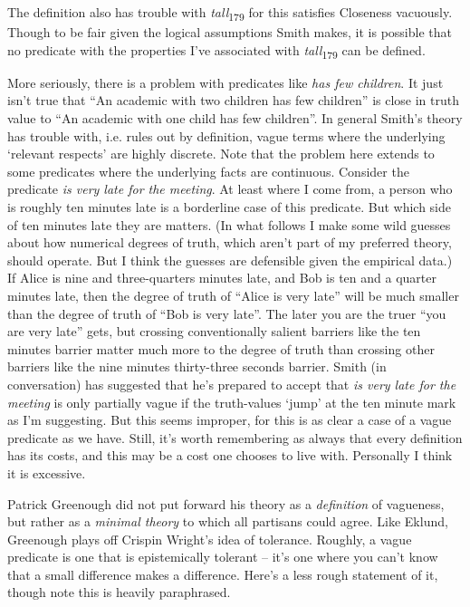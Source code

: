 The definition also has trouble with \textit{tall}\textsubscript{179} for this satisfies Closeness vacuously. Though to be fair given the logical assumptions Smith makes, it is possible that no predicate with the properties I've associated with \textit{tall}\textsubscript{179} can be defined.

More seriously, there is a problem with predicates like \textit{has few children}. It just isn't true that ``An academic with two children has few children'' is close in truth value to ``An academic with one child has few children''. In general Smith's theory has trouble with, i.e. rules out by definition, vague terms where the underlying `relevant respects' are highly discrete. Note that the problem here extends to some predicates where the underlying facts are continuous. Consider the predicate \textit{is very late for the meeting}. At least where I come from, a person who is roughly ten minutes late is a borderline case of this predicate. But which side of ten minutes late they are matters. (In what follows I make some wild guesses about how numerical degrees of truth, which aren't part of my preferred theory, should operate. But I think the guesses are defensible given the empirical data.) If Alice is nine and three-quarters minutes late, and Bob is ten and a quarter minutes late, then the degree of truth of ``Alice is very late'' will be much smaller than the degree of truth of ``Bob is very late''. The later you are the truer ``you are very late'' gets, but crossing conventionally salient barriers like the ten minutes barrier matter much more to the degree of truth than crossing other barriers like the nine minutes thirty-three seconds barrier. Smith (in conversation) has suggested that he's prepared to accept that \textit{is very late for the meeting} is only partially vague if the truth-values `jump' at the ten minute mark as I'm suggesting. But this seems improper, for this is as clear a case of a vague predicate as we have. Still, it's worth remembering as always that every definition has its costs, and this may be a cost one chooses to live with. Personally I think it is excessive.

Patrick Greenough did not put forward his theory as a \textit{definition} of vagueness, but rather as a \textit{minimal theory} to which all partisans could agree. Like Eklund, Greenough plays off Crispin Wright's idea of tolerance. Roughly, a vague predicate is one that is epistemically tolerant -- it's one where you can't know that a small difference makes a difference. Here's a less rough statement of it, though note this is heavily paraphrased.

